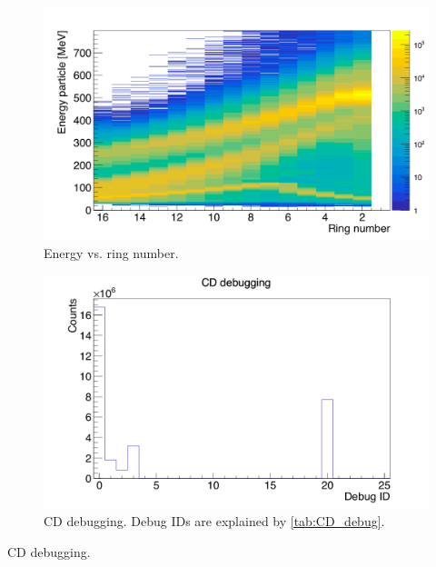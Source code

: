\documentclass[twoside,english]{uiofysmaster/uiofysmaster}
\begin{document}
\begin{figure}[ht]
	\centering
	\includegraphics[width=\textwidth]{../Plots/plotting/E_vs_ring_all.png}
	\caption{Energy vs. ring number.}
	\label{fig:part}
\end{figure}



\begin{figure}[ht]
	\centering
	\includegraphics[width=\textwidth]{../Plots/plotting/cd_debug-user.png}
	\caption{CD debugging. Debug IDs are explained by \autoref{tab:CD_debug}. }
	\label{fig:CD_debug}
\end{figure}

\begin{table}[ht] 
	\centering 
	\caption{CD debugging.}
	
	\label{tab:CD_debug}
\end{table}
\end{document}
